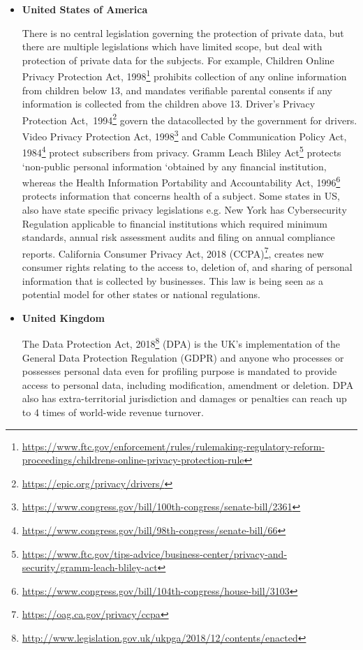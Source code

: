 \begin{multicols}{2}
\begin{itemize}
\item[{\bf 5.}] \textbf{United States of America}

There is no central legislation governing the protection of private data, but there are multiple legislations which have limited scope, but deal with protection of private data for the subjects. For example, Children Online Privacy Protection Act, 1998\footnote{\url{https://www.ftc.gov/enforcement/rules/rulemaking-regulatory-reform-proceedings/childrens-online-privacy-protection-rule}} prohibits collection of any online information from children below 13, and mandates verifiable parental consents if any information is collected from the children above 13. Driver’s Privacy Protection \hbox{Act, 1994}\footnote{\url{https://epic.org/privacy/drivers/}} govern the data\break collected by the government for drivers. Video Privacy Protection Act, 1998\footnote{\url{https://www.congress.gov/bill/100th-congress/senate-bill/2361}} and Cable Communication Policy Act, 1984\footnote{\url{ https://www.congress.gov/bill/98th-congress/senate-bill/66}} protect subscribers from privacy. Gramm Leach Bliley Act\footnote{\url{https://www.ftc.gov/tips-advice/business-center/privacy-and-security/gramm-leach-bliley-act}} protects ‘non-public personal information ‘obtained by any financial institution, whereas the Health Information Portability and Accountability Act, 1996\footnote{\url{https://www.congress.gov/bill/104th-congress/house-bill/3103}} protects information that concerns health of a subject. Some states in US, also have state specific privacy legislations e.g. New York has Cybersecurity Regulation applicable to financial institutions which required minimum standards, annual risk assessment audits and filing on annual compliance reports. California Consumer Privacy Act, 2018 (CCPA)\footnote{\url{https://oag.ca.gov/privacy/ccpa}}, creates new consumer rights relating to the access to, deletion of, and sharing of personal information that is collected by businesses. This law is being seen as a potential model for other states or national regulations. 

\item[{\bf 6.}] \textbf{United Kingdom}

The Data Protection Act, 2018\footnote{\url{http://www.legislation.gov.uk/ukpga/2018/12/contents/enacted}} (DPA) is the UK’s implementation of the General Data Protection Regulation (GDPR) and anyone who processes or possesses personal data even for profiling purpose is mandated to provide access to personal data, including modification, amendment or deletion. DPA also has extra-territorial jurisdiction and damages or penalties can reach up to 4 times of world-wide revenue turnover.
\end{itemize}


\end{multicols}
